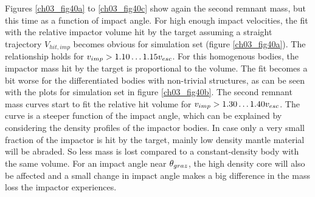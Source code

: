
Figures \ref{ch03_fig40a} to \ref{ch03_fig40c} show again the second remnant mass, but this time as a function of impact angle. For high enough impact velocities, the fit with the relative impactor volume hit by the target assuming a straight trajectory $V_{hit, imp}$ becomes obvious for simulation set \rss (figure \ref{ch03_fig40a}). The relationship holds for $v_{imp} > 1.10 \dots 1.15 v_{esc}$. For this homogenous bodies, the impactor mass hit by the target is proportional to the volume. The fit becomes a bit worse for the differentiated bodies with non-trivial structures, as can be seen with the plots for simulation set \css in figure \ref{ch03_fig40b}. The second remnant mass curves start to fit the relative hit volume for $v_{imp} > 1.30 \dots 1.40 v_{esc}$. The curve is a steeper function of the impact angle, which can be explained by considering the density profiles of the impactor bodies. In case only a very small fraction of the impactor is hit by the target, mainly low density mantle material will be abraded. So less mass is lost compared to a constant-density body with the same volume. For an impact angle near $\theta_{graz}$, the high density core will also be affected and a small change in impact angle makes a big difference in the mass loss the impactor experiences.

